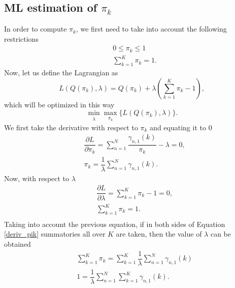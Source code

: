 \documentclass[12pt]{article}
\begin{document}
\subsection{ML estimation of $\pi_{k}$}
In order to compute $\pi_{k}$, we first need to take into account the following restrictions
\begin{align}
& 0 \leq \pi_{k} \leq 1 \\
& \sum\limits_{k = 1}^{K} \pi_{k} = 1.
\end{align}
Now, let us define the Lagrangian as
\begin{equation}
\label{lagrange_pik}
L\left( Q(\pi_{k}),\lambda \right) = Q(\pi_{k}) + \lambda \left( \sum \limits_{k=1}^{K} \pi_{k} - 1 \right),
\end{equation}
which will be optimized in this way
\begin{equation}
\label{minmax_lagrange_pik}
\min_{\substack{\lambda}} \max_{\substack{\pi_{k}}} \lbrace L\left( Q(\pi_{k}),\lambda \right) \rbrace.
\end{equation}
We first take the derivative with respect to $\pi_{k}$ and equating it to 0
\begin{equation}
\label{deriv_pik}
\begin{split}
& \dfrac{\partial L}{\partial \pi_{k}} = \sum \limits_{n=1}^{N} \dfrac{\gamma_{n,1}(k)}{\pi_{k}} - \lambda = 0, \\
& \pi_{k} = \dfrac{1}{\lambda} \sum \limits_{n=1}^{N} \gamma_{n,1}(k).
\end{split}
\end{equation}
Now, with respect to $\lambda$
\begin{equation}
\begin{split}
& \dfrac{\partial L}{\partial \lambda} = \sum \limits_{k=1}^{K} \pi_{k} - 1 = 0,\\
& \sum \limits_{k=1}^{K} \pi_{k} = 1.\\
\end{split}
\end{equation}
Taking into account the previous equation, if in both sides of Equation \ref{deriv_pik} summatories all over $K$ are taken, then the value of $\lambda$ can be obtained
\begin{equation}
\begin{split}
& \sum \limits_{k=1}^{K}\pi_{k} = \sum \limits_{k=1}^{K} \dfrac{1}{\lambda} \sum \limits_{n=1}^{N} \gamma_{n,1}(k)\\
& 1 = \dfrac{1}{\lambda} \sum \limits_{n=1}^{N}\sum \limits_{k=1}^{K}\gamma_{n,1}(k).\\
\end{split}
\end{equation}
\end{document}
